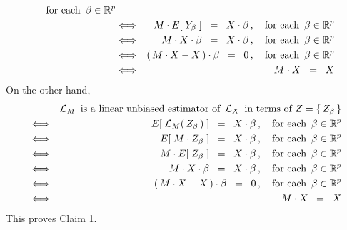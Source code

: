 \begin{enumerate}
\begin{eqnarray*}
		\quad\textnormal{for each \,$\beta\in\Re^{p}$}
	\\
	&\Longleftrightarrow&
		M \cdot E\!\left[\; Y_{\beta} \;\right] \;\;=\;\; X \cdot \beta\,,
		\quad\textnormal{for each \,$\beta\in\Re^{p}$}
	\\
	&\Longleftrightarrow&
		M \cdot X \cdot \beta \;\;=\;\; X \cdot \beta\,,
		\quad\textnormal{for each \,$\beta\in\Re^{p}$}
	\\
	&\Longleftrightarrow&
		\left(\,M \cdot X - X\,\right) \cdot \beta \;\;=\;\; 0\,,
		\quad\textnormal{for each \,$\beta\in\Re^{p}$}
	\\
	&\Longleftrightarrow&
		M \cdot X \;\; = \;\; X
	\end{eqnarray*}
	On the other hand,
	\begin{eqnarray*}
	&&
		\textnormal{$\mathcal{L}_{M}$\, is a linear unbiased estimator of \,$\mathcal{L}_{X}$\,
		in terms of $Z = \{\,Z_{\beta}\,\}$}
	\\
	&\Longleftrightarrow&
		E\!\left[\;\mathcal{L}_{M}(\,Z_{\beta}\,)\;\right] \;\;=\;\; X \cdot \beta\,,
		\quad\textnormal{for each \,$\beta\in\Re^{p}$}
	\\
	&\Longleftrightarrow&
		E\!\left[\; M \cdot Z_{\beta} \;\right] \;\;=\;\; X \cdot \beta\,,
		\quad\textnormal{for each \,$\beta\in\Re^{p}$}
	\\
	&\Longleftrightarrow&
		M \cdot E\!\left[\; Z_{\beta} \;\right] \;\;=\;\; X \cdot \beta\,,
		\quad\textnormal{for each \,$\beta\in\Re^{p}$}
	\\
	&\Longleftrightarrow&
		M \cdot X \cdot \beta \;\;=\;\; X \cdot \beta\,,
		\quad\textnormal{for each \,$\beta\in\Re^{p}$}
	\\
	&\Longleftrightarrow&
		\left(\,M \cdot X - X\,\right) \cdot \beta \;\;=\;\; 0\,,
		\quad\textnormal{for each \,$\beta\in\Re^{p}$}
	\\
	&\Longleftrightarrow&
		M \cdot X \;\; = \;\; X
	\end{eqnarray*}
	This proves Claim 1.


\end{enumerate}
